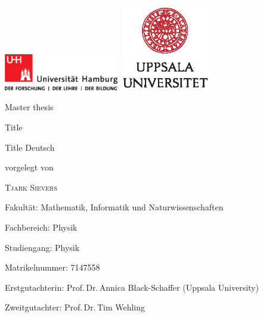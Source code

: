 \documentclass[main.tex]{subfiles}
\begin{document}
\begin{fullsizetitle}
    \vspace{2cm}
    \hspace{0.1\textwidth}
    \vline\hspace{10pt}
    \begin{minipage}[t][0.8\textheight][t]{0.8\textwidth}
        \includegraphics[width=5cm, valign=c]{images/logos/up-uhh-logo-u-2010-u-farbe-u-cmyk}
        \includegraphics[width=4cm, valign=c]{images/logos/UU_logo_CMYK}\par
        \vspace{1\baselineskip}

    \begin{FlushLeft}
        {\Large\textcolor{UHHred}{Master thesis}\par}

        {\Huge Title\par}

       \vspace{1\baselineskip}
        
        {\Large Title Deutsch\par}

        \vspace{4\baselineskip}

        vorgelegt von

        {\Large\textsc{Tjark Sievers}\par}
    \end{FlushLeft}

    \vfill
    
    \begin{FlushLeft}
        Fakultät: Mathematik, Informatik und Naturwissenschaften\par
        Fachbereich: Physik\par
        Studiengang: Physik\par
        Matrikelnummer: 7147558

        Erstgutachterin: Prof.\,Dr.\,Annica Black-Schaffer (Uppsala University) \par
        Zweitgutachter: Prof.\,Dr.\,Tim Wehling \par
    \end{FlushLeft}
    \end{minipage}
\end{fullsizetitle}
\end{document}
